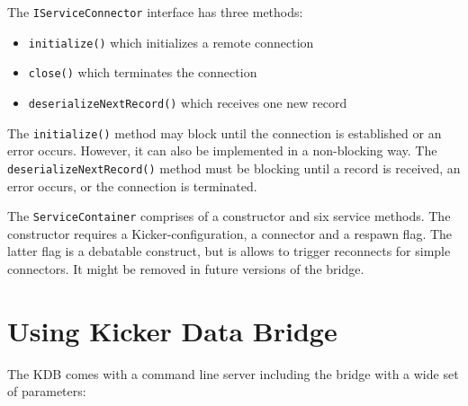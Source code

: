\documentclass[11pt,a4paper]{article}
\begin{document}
The \texttt{IServiceConnector} interface has three methods:

\begin{itemize}
\item \texttt{initialize()} which initializes a remote connection
\item \texttt{close()} which terminates the connection
\item \texttt{deserializeNextRecord()} which receives one new record
\end{itemize}

\noindent
The \texttt{initialize()} method may block until the connection is established or an error occurs. However, it can also be implemented in a non-blocking way. The \texttt{deserializeNextRecord()} method must be blocking until a record is received, an error occurs, or the connection is terminated.

The \texttt{ServiceContainer} comprises of a constructor and six service methods. The constructor requires a Kicker-configuration, a connector and a respawn flag. The latter flag is a debatable construct, but is allows to trigger reconnects for simple connectors. It might be removed in future versions of the bridge.

\section{Using Kicker Data Bridge}\label{s:using-kdb}

The KDB comes with a command line server including the bridge with a wide set of parameters:
\end{document}
